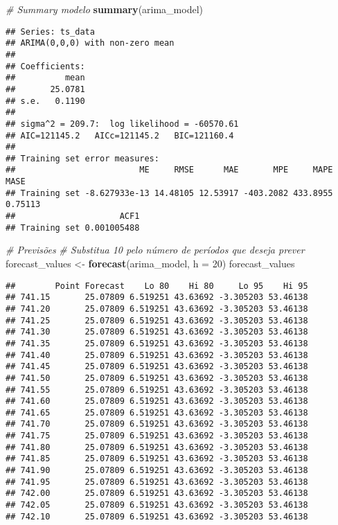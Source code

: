 \documentclass[
]{article}
\newenvironment{Shaded}{\begin{snugshade}}{\end{snugshade}}
\newcommand{\AttributeTok}[1]{\textcolor[rgb]{0.13,0.29,0.53}{#1}}
\newcommand{\CommentTok}[1]{\textcolor[rgb]{0.56,0.35,0.01}{\textit{#1}}}
\newcommand{\DecValTok}[1]{\textcolor[rgb]{0.00,0.00,0.81}{#1}}
\newcommand{\FunctionTok}[1]{\textcolor[rgb]{0.13,0.29,0.53}{\textbf{#1}}}
\newcommand{\NormalTok}[1]{#1}
\newcommand{\OtherTok}[1]{\textcolor[rgb]{0.56,0.35,0.01}{#1}}
\begin{document}
\begin{Shaded}
\begin{Highlighting}[]
\CommentTok{\# Summary modelo}
\FunctionTok{summary}\NormalTok{(arima\_model)}
\end{Highlighting}
\end{Shaded}

\begin{verbatim}
## Series: ts_data 
## ARIMA(0,0,0) with non-zero mean 
## 
## Coefficients:
##          mean
##       25.0781
## s.e.   0.1190
## 
## sigma^2 = 209.7:  log likelihood = -60570.61
## AIC=121145.2   AICc=121145.2   BIC=121160.4
## 
## Training set error measures:
##                         ME     RMSE      MAE       MPE     MAPE    MASE
## Training set -8.627933e-13 14.48105 12.53917 -403.2082 433.8955 0.75113
##                     ACF1
## Training set 0.001005488
\end{verbatim}

\begin{Shaded}
\begin{Highlighting}[]
\CommentTok{\# Previsões}
\CommentTok{\# Substitua 10 pelo número de períodos que deseja prever}
\NormalTok{forecast\_values }\OtherTok{\textless{}{-}} \FunctionTok{forecast}\NormalTok{(arima\_model, }\AttributeTok{h =} \DecValTok{20}\NormalTok{)  }
\NormalTok{forecast\_values}
\end{Highlighting}
\end{Shaded}

\begin{verbatim}
##        Point Forecast    Lo 80    Hi 80     Lo 95    Hi 95
## 741.15       25.07809 6.519251 43.63692 -3.305203 53.46138
## 741.20       25.07809 6.519251 43.63692 -3.305203 53.46138
## 741.25       25.07809 6.519251 43.63692 -3.305203 53.46138
## 741.30       25.07809 6.519251 43.63692 -3.305203 53.46138
## 741.35       25.07809 6.519251 43.63692 -3.305203 53.46138
## 741.40       25.07809 6.519251 43.63692 -3.305203 53.46138
## 741.45       25.07809 6.519251 43.63692 -3.305203 53.46138
## 741.50       25.07809 6.519251 43.63692 -3.305203 53.46138
## 741.55       25.07809 6.519251 43.63692 -3.305203 53.46138
## 741.60       25.07809 6.519251 43.63692 -3.305203 53.46138
## 741.65       25.07809 6.519251 43.63692 -3.305203 53.46138
## 741.70       25.07809 6.519251 43.63692 -3.305203 53.46138
## 741.75       25.07809 6.519251 43.63692 -3.305203 53.46138
## 741.80       25.07809 6.519251 43.63692 -3.305203 53.46138
## 741.85       25.07809 6.519251 43.63692 -3.305203 53.46138
## 741.90       25.07809 6.519251 43.63692 -3.305203 53.46138
## 741.95       25.07809 6.519251 43.63692 -3.305203 53.46138
## 742.00       25.07809 6.519251 43.63692 -3.305203 53.46138
## 742.05       25.07809 6.519251 43.63692 -3.305203 53.46138
## 742.10       25.07809 6.519251 43.63692 -3.305203 53.46138
\end{verbatim}
\end{document}
